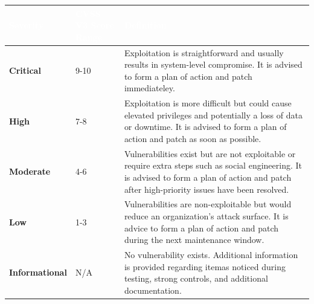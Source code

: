 \documentclass[a4paper]{article} %
\begin{document}
    \vspace{0.3cm}

    \begin{table}[htbp]
        \centering
        \begin{tabularx}{\textwidth}{|>{\centering\arraybackslash}X|>{\centering\arraybackslash}X|>{\centering\arraybackslash}p{10cm}|}
            \hline
            \rowcolor{gray}
            \textbf{\textcolor{white}{Severity}} & \textbf{\textcolor{white}{CVSS V3 Score Range}} & \textbf{\textcolor{white}{Definition}} \\
            \hline
            \cellcolor{criticalColor}\textbf{Critical} & 
            {9-10} & 
            \parbox[t]{10cm}{
                Exploitation is straightforward and usually results in system-level compromise. It is advised to form a plan of action and patch immediateley.
            } \\
            \hline
            \textbf{High} & 
            {7-8} & 
            \parbox[t]{10cm}{
                Exploitation is more difficult but could cause elevated privileges and potentially a loss of data or downtime. It is advised to form a plan of action and patch as soon as possible.
            } \\
            \hline
            \textbf{Moderate} & 
            {4-6} & 
            \parbox[t]{10cm}{
                Vulnerabilities exist but are not exploitable or require extra steps such as social engineering. It is advised to form a plan of action and patch after high-priority issues have been resolved.
            } \\
            \hline
            \textbf{Low} & 
            {1-3} & 
            \parbox[t]{10cm}{
                Vulnerabilities are non-exploitable but would reduce an organization's attack surface. It is advice to form a plan of action and patch during the next maintenance window.
            } \\
            \hline
            \textbf{Informational} & 
            {N/A} & 
            \parbox[t]{10cm}{
                No vulnerability exists. Additional information is provided regarding itemas noticed during testing, strong controls, and additional documentation.
            } \\
            \hline
        \end{tabularx}
    \end{table}
\end{document}
